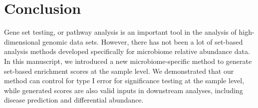 \documentclass{article}
\begin{document}
\section*{Conclusion}
Gene set testing, or pathway analysis is an important tool in the analysis of high-dimensional genomic data sets. However, there has not been a lot of set-based analysis methods developed specifically for microbiome relative abundance data. In this manuscript, we introduced a new microbiome-specific method to generate set-based enrichment scores at the sample level. We demonstrated that our method can control for type I error for significance testing at the sample level, while generated scores are also valid inputs in downstream analyses, including disease prediction and differential abundance. 

\newpage
{}

\end{document}
